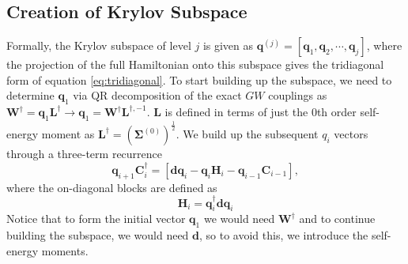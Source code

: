 \subsection{Creation of Krylov Subspace}
Formally, the Krylov subspace of level $j$ is given as $\mathbf{q}^{(j)}=\left[\mathbf{q}_1, \mathbf{q}_2, \cdots, \mathbf{q}_j\right]$, where the projection of the full Hamiltonian onto this subspace gives the tridiagonal form of equation \ref{eq:tridiagonal}. To start building up the subspace, we need to determine $\mathbf{q}_1$ via QR decomposition of the exact $GW$ couplings as $\mathbf{W}^\dag = \mathbf{q}_1 \mathbf{L}^\dag \rightarrow \mathbf{q}_1 = \mathbf{W}^\dag \mathbf{L}^{\dag, -1}$. $\mathbf{L}$ is defined in terms of just the 0th order self-energy moment as $\mathbf{L}^\dag = \left(\boldsymbol{\Sigma}^{(0)}\right)^{\frac{1}{2}}$. We build up the subsequent $q_i$ vectors through a three-term recurrence
\begin{equation}
    \mathbf{q}_{i+1} \mathbf{C}_i^{\dagger}=\left[\mathbf{d} \mathbf{q}_i-\mathbf{q}_{i} \mathbf{H}_i-\mathbf{q}_{i-1} \mathbf{C}_{i-1}\right],
\end{equation}
where the on-diagonal blocks are defined as
\begin{equation}
    \mathbf{H}_i=\mathbf{q}_i^{\dagger} \mathbf{d} \mathbf{q}_i
\end{equation}
Notice that to form the initial vector $\mathbf{q}_1$ we would need $\mathbf{W}^\dag$ and to continue building the subspace, we would need $\mathbf{d}$, so to avoid this, we introduce the self-energy moments.

